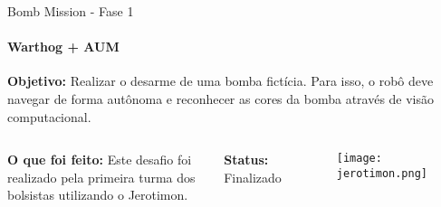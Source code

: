 \begin{frame}[t]{Bomb Mission - Fase 1} 
    \framesubtitle{Warthog + AUM}

    \textbf{Objetivo:} Realizar o desarme de uma bomba fictícia. Para isso, o robô deve navegar de forma autônoma e reconhecer as cores da bomba através de visão computacional.

    \vspace*{0.3cm}
        \begin{columns}[t]
            \vspace*{0.8cm}

            \textbf{O que foi feito:} 
             Este desafio foi realizado pela primeira 
             turma dos bolsistas utilizando o Jerotimon.
            \vspace*{0.5cm}

            \textbf{Status:} Finalizado
            \begin{center}
                \begin{figure}
                    \texttt{[image: jerotimon.png]}
                \end{figure}
            \end{center}
        \end{columns}
\end{frame}
